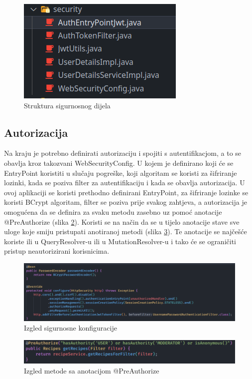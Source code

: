 \documentclass[times, utf8, zavrsni]{fer}
\begin{document}
\begin{figure}[h]
      \centering
      \includegraphics[width=.5\textwidth]{security_implementation.png}
      \caption{Struktura sigurnosnog dijela}
      \label{fig:Security}
\end{figure}

\subsection{Autorizacija}
Na kraju je potrebno definirati autorizaciju i spojiti s autentifikacjom, a to se obavlja kroz takozvani WebSecurityConfig.
U kojem je definirano koji će se EntryPoint koristiti u slučaju pogreške, koji algoritam se koristi za šifriranje lozinki,
kada se poziva filter za autentifikaciju i kada se obavlja autorizacija. U ovoj aplikaciji se koristi prethodno
definirani EntryPoint, za šifriranje lozinke se koristi BCrypt algoritam, filter se poziva prije svakog zahtjeva, a
autorizacija je omogućena da se definira za svaku metodu zasebno uz pomoć anotacije @PreAuthorize (slika \ref{fig:WebSecurityConfig}).
Koristi se na način da se u tijelo anotacije stave sve uloge koje smiju pristupati anotiranoj metodi (slika \ref{fig:PreAuthorize}).
Te anotacije se najčešće koriste ili u QueryResolver-u ili u MutationResolver-u i tako će se ograničiti pristup
neautorizirani korisnicima.
\begin{figure}[h]
      \centering
      \includegraphics[width=\textwidth]{WebSecurityConfig.png}
      \caption{Izgled sigurnosne konfiguracije}
      \label{fig:WebSecurityConfig}
\end{figure}
\begin{figure}[h]
      \centering
      \includegraphics[width=\textwidth]{PreAuthorize.png}
      \caption{Izgled metode sa anotacijom @PreAuthorize}
      \label{fig:PreAuthorize}
\end{figure}
\end{document}
